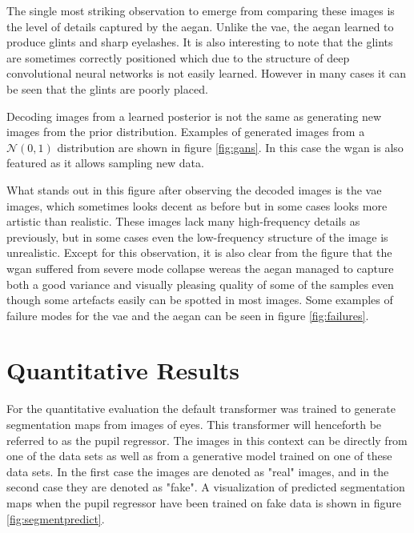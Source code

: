 The single most striking observation to emerge from comparing these images is the level of details captured by the \acrshort{aegan}. Unlike the \acrshort{vae}, the \acrshort{aegan} learned to produce glints and sharp eyelashes. It is also interesting to note that the glints are sometimes correctly positioned which due to the structure of deep convolutional neural networks is not easily learned. However in many cases it can be seen that the glints are poorly placed.

Decoding images from a learned posterior is not the same as generating new images from the prior distribution. Examples of generated images from a $\mathcal{N}(0, 1)$ distribution are shown in figure \ref{fig:gans}. In this case the \acrshort{wgan} is also featured as it allows sampling new data. 

What stands out in this figure after observing the decoded images is the \acrshort{vae} images, which sometimes looks decent as before but in some cases looks more artistic than realistic. These images lack many high-frequency details as previously, but in some cases even the low-frequency structure of the image is unrealistic. Except for this observation, it is also clear from the figure that the \acrshort{wgan} suffered from severe mode collapse wereas the \acrshort{aegan} managed to capture both a good variance and visually pleasing quality of some of the samples even though some artefacts easily can be spotted in most images. Some examples of failure modes for the \acrshort{vae} and the \acrshort{aegan} can be seen in figure \ref{fig:failures}.



\section{Quantitative Results}
For the quantitative evaluation the default transformer was trained to generate segmentation maps from images of eyes. This transformer will henceforth be referred to as the pupil regressor. The images in this context can be directly from one of the data sets as well as from a generative model trained on one of these data sets. In the first case the images are denoted as "real" images, and in the second case they are denoted as "fake". A visualization of predicted segmentation maps when the pupil regressor have been trained on fake data is shown in figure \ref{fig:segmentpredict}.

